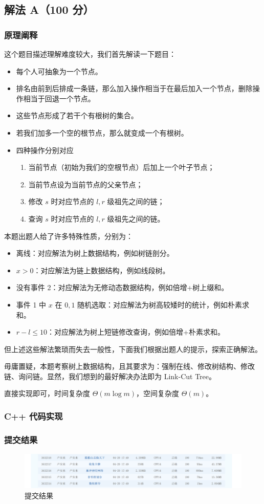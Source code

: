 	\subsection{解法 A（100 分）}
		\subsubsection{原理阐释}
			\par 这个题目描述理解难度较大，我们首先解读一下题目：
			\begin{itemize}
				\item 每个人可抽象为一个节点。
				\item 排名由前到后排成一条链，那么加入操作相当于在最后加入一个节点，删除操作相当于回退一个节点。
				\item 这些节点形成了若干个有根树的集合。
				\item 若我们加多一个空的根节点，那么就变成一个有根树。
				\item 四种操作分别对应
					\begin{enumerate}
						\item 当前节点（初始为我们的空根节点）后加上一个叶子节点；
						\item 当前节点设为当前节点的父亲节点；
						\item 修改 $s$ 时对应节点的 $l,r$ 级祖先之间的链；
						\item 查询 $s$ 时对应节点的 $l,r$ 级祖先之间的链。
					\end{enumerate}
			\end{itemize}
			\par 本题出题人给了许多特殊性质，分别为：
			\begin{itemize}
				\item 离线：对应解法为树上数据结构，例如树链剖分。
				\item $x>0$：对应解法为链上数据结构，例如线段树。
				\item 没有事件 2：对应解法为无修动态数据结构，例如倍增+树上缀和。
				\item 事件 1 中 $x$ 在 $0,1$ 随机选取：对应解法为树高较矮时的统计，例如朴素求和。
				\item $r-l\leq 10$：对应解法为树上短链修改查询，例如倍增+朴素求和。
			\end{itemize}
			\par 但上述这些解法繁琐而失去一般性，下面我们根据出题人的提示，探索正确解法。
			\par 毋庸置疑，本题考察树上数据结构，且其要求为：强制在线、修改树结构、修改链、询问链。显然，我们想到的最好解决办法即为 Link-Cut Tree。
			\par 直接实现即可，时间复杂度 $\Theta(m\log m)$，空间复杂度 $\Theta(m)$。
		\subsubsection{C++ 代码实现}
			
		\subsubsection{提交结果}
			\begin{figure}[htbp]
				\centering
				\includegraphics[width=1\textwidth]{result.png}
				\caption{提交结果}
			\end{figure}